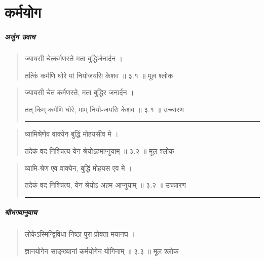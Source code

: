 \chapter{\sanskrit कर्मयोग}

\sanskrit

\paragraph{\sanskrit अर्जुन उवाच}
\begin{quotation}
	
ज्यायसी चेत्कर्मणस्ते मता बुद्धिर्जनार्दन  ।  

तत्किं कर्मणि घोरे मां नियोजयसि केशव  ॥ ३.१ ॥  मूल श्लोक
\end{quotation}

\begin{quotation}

ज्यायसी चेत कर्मणस्ते, मता बुद्धिर जनार्दन  ।  

तत् किम् कर्मणि घोरे, माम् नियो-जयसि केशव  ॥ ३.१ ॥  उच्चारण

\noindent\rule{16cm}{0.4pt} 
\end{quotation}


\begin{quotation}

व्यामिश्रेणेव वाक्येन बुद्धिं मोहयसीव मे  ।  

तदेकं वद निश्चित्य येन श्रेयोऽहमाप्नुयाम्‌  ॥ ३.२ ॥  मूल श्लोक
\end{quotation}

\begin{quotation}

व्यामि-श्रेण एव वाक्येन, बुद्धिं मोहयस एव मे  ।  

तदेकं वद निश्चित्य, येन श्रेयोऽ अहम आप्नुयाम्‌  ॥ ३.२ ॥  उच्चारण

\noindent\rule{16cm}{0.4pt} 
\end{quotation}


\paragraph{\sanskrit श्रीभगवानुवाच}

\begin{quotation}



लोकेऽस्मिन्द्विविधा निष्ठा पुरा प्रोक्ता मयानघ  ।  

ज्ञानयोगेन साङ्‍ख्यानां कर्मयोगेन योगिनाम्‌  ॥ ३.३ ॥  मूल श्लोक
\end{quotation}

